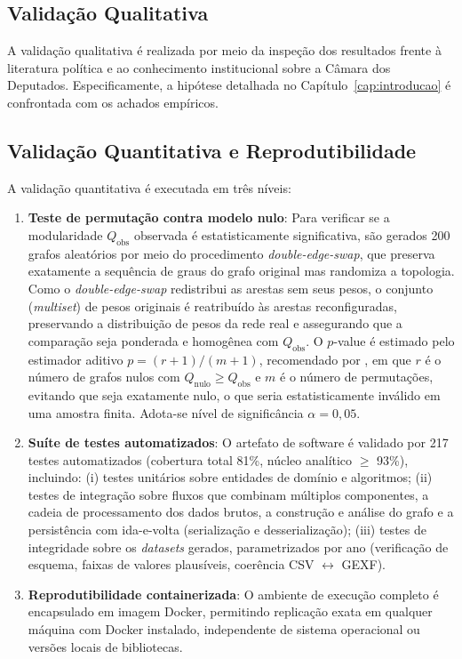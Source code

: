 \documentclass[
      12pt,
      a4paper,
      openright,
      oneside,
      chapter=TITLE,
      section=TITLE,
      english,
      french,
      spanish,
      brazilian
    ]{abntex2}
\begin{document}
    \subsection{Validação Qualitativa}
    
    A validação qualitativa é realizada por meio da inspeção dos resultados frente à literatura política e ao conhecimento institucional sobre a Câmara dos Deputados. Especificamente, a hipótese detalhada no Capítulo~\ref{cap:introducao} é confrontada com os achados empíricos.
    
    \subsection{Validação Quantitativa e Reprodutibilidade}
    
    A validação quantitativa é executada em três níveis:
    
    \begin{enumerate}[label=\alph*)]
        \item \textbf{Teste de permutação contra modelo nulo}: 
        Para verificar se a modularidade $Q_{\text{obs}}$ observada é estatisticamente significativa, são gerados 200 grafos aleatórios por meio do procedimento \textit{double-edge-swap}, que preserva exatamente a sequência de graus do grafo original mas randomiza a topologia. Como o \textit{double-edge-swap} redistribui as arestas sem seus pesos, o conjunto (\textit{multiset}) de pesos originais é reatribuído às arestas reconfiguradas, preservando a distribuição de pesos da rede real e assegurando que a comparação seja ponderada e homogênea com $Q_{\text{obs}}$. O $p$-value é estimado pelo estimador aditivo $p = (r+1)/(m+1)$, recomendado por , em que $r$ é o número de grafos nulos com $Q_{\text{nulo}} \geq Q_{\text{obs}}$ e $m$ é o número de permutações, evitando que seja exatamente nulo, o que seria estatisticamente inválido em uma amostra finita. Adota-se nível de significância $\alpha = 0{,}05$.
        
        \item \textbf{Suíte de testes automatizados}:
        O artefato de software é validado por 217 testes automatizados (cobertura total 81\%, núcleo analítico $\geq$ 93\%), incluindo: (i) testes unitários sobre entidades de domínio e algoritmos; (ii) testes de integração sobre fluxos que combinam múltiplos componentes, a cadeia de processamento dos dados brutos, a construção e análise do grafo e a persistência com ida-e-volta (serialização e desserialização); (iii) testes de integridade sobre os \textit{datasets} gerados, parametrizados por ano (verificação de esquema, faixas de valores plausíveis, coerência CSV $\leftrightarrow$ GEXF).
    
        \item \textbf{Reprodutibilidade containerizada}:
        O ambiente de execução completo é encapsulado em imagem Docker, permitindo replicação exata em qualquer máquina com Docker instalado, independente de sistema operacional ou versões locais de bibliotecas.
    \end{enumerate}
    
\end{document}
